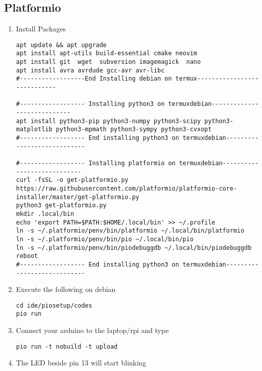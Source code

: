 \subsection{Platformio }
\begin{enumerate}[label=\arabic*.,ref=\theenumi]
	\item Install Packages
\begin{lstlisting}
apt update && apt upgrade
apt install apt-utils build-essential cmake neovim
apt install git  wget  subversion imagemagick  nano  
apt install avra avrdude gcc-avr avr-libc
#------------------End Installing debian on termux----------------------------

#------------------ Installing python3 on termuxdebian----------------------------
apt install python3-pip python3-numpy python3-scipy python3-matplotlib python3-mpmath python3-sympy python3-cvxopt
#------------------ End installing python3 on termuxdebian----------------------------

#------------------ Installing platformio on termuxdebian----------------------------
curl -fsSL -o get-platformio.py https://raw.githubusercontent.com/platformio/platformio-core-installer/master/get-platformio.py
python3 get-platformio.py
mkdir .local/bin
echo 'export PATH=$PATH:$HOME/.local/bin' >> ~/.profile
ln -s ~/.platformio/penv/bin/platformio ~/.local/bin/platformio 
ln -s ~/.platformio/penv/bin/pio ~/.local/bin/pio 
ln -s ~/.platformio/penv/bin/piodebuggdb ~/.local/bin/piodebuggdb
reboot
#------------------ End installing python3 on termuxdebian----------------------------
\end{lstlisting}
\item Execute the following on debian
\begin{lstlisting}
cd ide/piosetup/codes
pio run
\end{lstlisting}
\item Connect your arduino to the  laptop/rpi and type
\begin{lstlisting}
pio run -t nobuild -t upload
\end{lstlisting}
\item The LED beside pin 13 will start
blinking

\end{enumerate}
